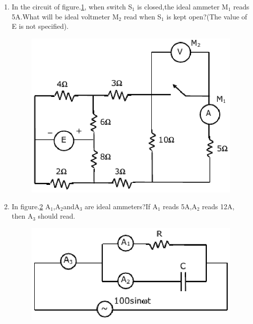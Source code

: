 \documentclass[journal,12pt,twocolumn]{IEEEtran}
\begin{document}
\begin{enumerate}
\item In the circuit of figure.\ref{fig6}, when switch S$_{1}$ is closed,the ideal ammeter M$_{1}$ reads 5A.What will be ideal voltmeter M$_{2}$ read when S$_{1}$ is kept open?(The value of E is not specified).
\begin{figure}[!h]
\begin{center}
\includegraphics[scale=0.7]{./figs/fig6.eps}
\caption{}
\label{fig6}
\end{center}
\end{figure}

\item In figure.\ref{fig7} A$_{1}$,A$_{2}$andA$_{3}$ are ideal ammeters?If A$_{1}$ reads 5A,A$_{2}$ reads 12A, then A$_{3}$ should read.
\begin{enumerate}
\begin{figure}[!h]
\begin{center}
\includegraphics[scale=0.7]{./figs/fig7.eps}
\caption{}
\label{fig7}
\end{center}
\end{figure}
\end{enumerate}


\end{enumerate}
\end{document}
